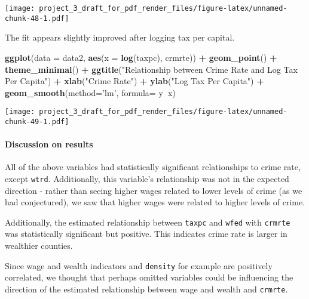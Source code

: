 \documentclass[]{article}
\newenvironment{Shaded}{\begin{snugshade}}{\end{snugshade}}
\newcommand{\DataTypeTok}[1]{\textcolor[rgb]{0.13,0.29,0.53}{#1}}
\newcommand{\KeywordTok}[1]{\textcolor[rgb]{0.13,0.29,0.53}{\textbf{#1}}}
\newcommand{\NormalTok}[1]{#1}
\newcommand{\OperatorTok}[1]{\textcolor[rgb]{0.81,0.36,0.00}{\textbf{#1}}}
\newcommand{\StringTok}[1]{\textcolor[rgb]{0.31,0.60,0.02}{#1}}
\let\oldparagraph\paragraph
\renewcommand{\paragraph}[1]{\oldparagraph{#1}\mbox{}}
\begin{document}
\texttt{[image: project\_3\_draft\_for\_pdf\_render\_files/figure-latex/unnamed-chunk-48-1.pdf]}

The fit appears slightly improved after logging tax per capital.

\begin{Shaded}
\begin{Highlighting}[]
\KeywordTok{ggplot}\NormalTok{(}\DataTypeTok{data =}\NormalTok{ data2, }\KeywordTok{aes}\NormalTok{(}\DataTypeTok{x =} \KeywordTok{log}\NormalTok{(taxpc), crmrte)) }\OperatorTok{+}
\StringTok{  }\KeywordTok{geom_point}\NormalTok{() }\OperatorTok{+}
\StringTok{  }\KeywordTok{theme_minimal}\NormalTok{() }\OperatorTok{+}
\StringTok{  }\KeywordTok{ggtitle}\NormalTok{(}\StringTok{"Relationship between Crime Rate and Log Tax Per Capita"}\NormalTok{) }\OperatorTok{+}\StringTok{ }
\StringTok{  }\KeywordTok{xlab}\NormalTok{(}\StringTok{"Crime Rate"}\NormalTok{) }\OperatorTok{+}\StringTok{ }\KeywordTok{ylab}\NormalTok{(}\StringTok{"Log Tax Per Capita"}\NormalTok{) }\OperatorTok{+}
\StringTok{  }\KeywordTok{geom_smooth}\NormalTok{(}\DataTypeTok{method=}\StringTok{'lm'}\NormalTok{, }\DataTypeTok{formula=}\NormalTok{ y}\OperatorTok{~}\NormalTok{x)}
\end{Highlighting}
\end{Shaded}

\texttt{[image: project\_3\_draft\_for\_pdf\_render\_files/figure-latex/unnamed-chunk-49-1.pdf]}

\hypertarget{discussion-on-results-1}{%
\paragraph{Discussion on results}\label{discussion-on-results-1}}

All of the above variables had statistically significant relationships
to crime rate, except \texttt{wtrd}. Additionally, this variable's
relationship was not in the expected direction - rather than seeing
higher wages related to lower levels of crime (as we had conjectured),
we saw that higher wages were related to higher levels of crime.

Additionally, the estimated relationship between \texttt{taxpc} and
\texttt{wfed} with \texttt{crmrte} was statistically significant but
positive. This indicates crime rate is larger in wealthier counties.

Since wage and wealth indicators and \texttt{density} for example are
positively correlated, we thought that perhaps omitted variables could
be influencing the direction of the estimated relationship between wage
and wealth and \texttt{crmrte}.
\end{document}
